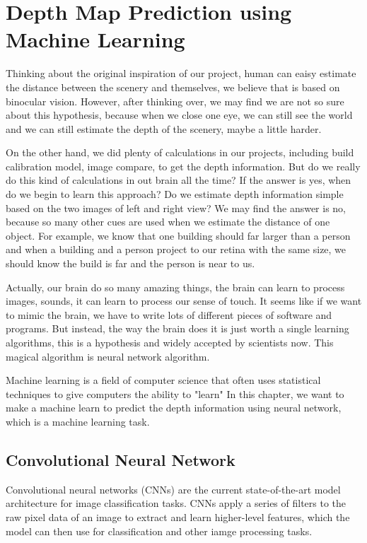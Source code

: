 \chapter{Depth Map Prediction using Machine Learning}

Thinking about the original inspiration of our project, human can eaisy estimate the distance between the scenery and themselves, we believe that is based on binocular vision. However, after thinking over, we may find we are not so sure about this hypothesis, because when we close one eye, we can still see the world and we can still estimate the depth of the scenery, maybe a little harder. 

On the other hand, we did plenty of calculations in our projects, including build calibration model, image compare, to get the depth information. But do we really do this kind of calculations in out brain all the time? If the answer is yes, when do we begin to learn this approach? Do we estimate depth information simple based on the two images of left and right view? We may find the answer is no, because so many other cues are used when we estimate the distance of one object. For example, we know that one building should far larger than a person and when a building and a person project to our retina with the same size, we should know the build is far and the person is near to us. 

Actually, our brain do so many amazing things, the brain can learn to process images, sounds, it can learn to process our sense of touch. It seems like if we want to mimic the brain, we have to write lots of different pieces of software and programs. But instead, the way the brain does it is just worth a single learning algorithms, this is a hypothesis and widely accepted by scientists now. This magical algorithm is neural network algorithm. 

Machine learning is a field of computer science that often uses statistical techniques to give computers the ability to "learn" In this chapter, we want to make a machine learn to predict the depth information using neural network, which is a machine learning task.

\section{Convolutional Neural Network}

Convolutional neural networks (CNNs) are the current state-of-the-art model architecture for image classification tasks. CNNs apply a series of filters to the raw pixel data of an image to extract and learn higher-level features, which the model can then use for classification and other iamge processing tasks.

